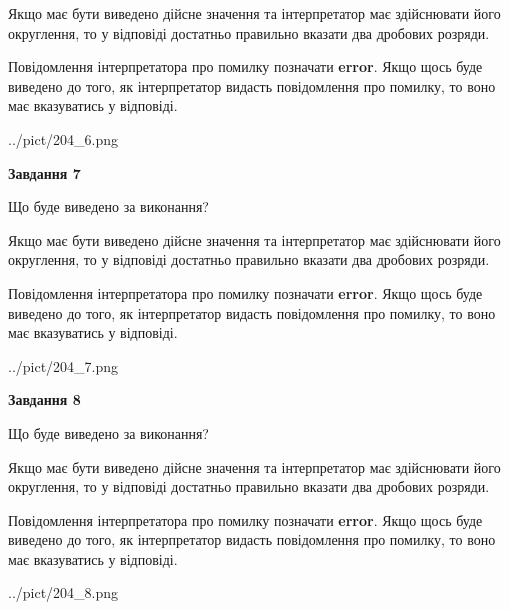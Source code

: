 \documentclass[12pt, ukrainian]{article}
\begin{document}
{\begin {Large}
Якщо має бути виведено дійсне значення та інтерпретатор має здійснювати його округлення, 
то у відповіді достатньо правильно вказати два дробових розряди.

Повідомлення інтерпретатора про помилку позначати \textbf{error}.
Якщо щось буде виведено до того, як інтерпретатор видасть повідомлення про помилку, 
то воно має вказуватись у відповіді. \par

\begin{center}
	{../pict/204_6.png}
\end{center}
\newpage

{\begin {center}\textbf{Завдання 7}\end {center}}\par
Що буде виведено за виконання? \par

Якщо має бути виведено дійсне значення та інтерпретатор має здійснювати його округлення, 
то у відповіді достатньо правильно вказати два дробових розряди.

Повідомлення інтерпретатора про помилку позначати \textbf{error}.
Якщо щось буде виведено до того, як інтерпретатор видасть повідомлення про помилку, 
то воно має вказуватись у відповіді. \par

\begin{center}
	{../pict/204_7.png}
\end{center}
\newpage

{\begin {center}\textbf{Завдання 8}\end {center}}\par
Що буде виведено за виконання? \par

Якщо має бути виведено дійсне значення та інтерпретатор має здійснювати його округлення, 
то у відповіді достатньо правильно вказати два дробових розряди.

Повідомлення інтерпретатора про помилку позначати \textbf{error}.
Якщо щось буде виведено до того, як інтерпретатор видасть повідомлення про помилку, 
то воно має вказуватись у відповіді. \par

\begin{center}
	{../pict/204_8.png}
\end{center}
\newpage


\end{Large}}
\end{document}
